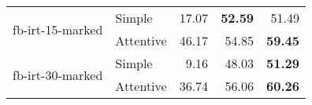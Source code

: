\begin{tabular}{| l | l | r | r | r |}
    \multirow{2}{*}{fb-irt-15-marked}
    & Simple & 17.07 & \textbf{52.59} & 51.49 \\
    & Attentive & 46.17 & 54.85 & \textbf{59.45} \\ \hline

    \multirow{2}{*}{fb-irt-30-marked}
    & Simple &  9.16 & 48.03 & \textbf{51.29} \\
    & Attentive & 36.74 & 56.06 & \textbf{60.26} \\ \hline

\end{tabular}
